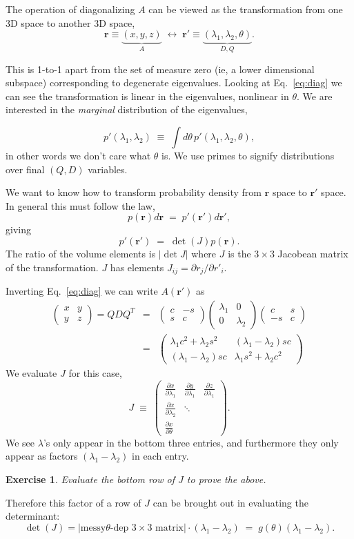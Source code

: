 \documentclass[12pt,letterpaper]{report}
\newcommand\be{\begin{equation}}
\newcommand\ee{\end{equation}}
\newcommand\bea{\begin{eqnarray}}
\newcommand\eea{\end{eqnarray}}
\newtheorem{exe}[thm]{Exercise}
\newcommand{\sym}[3]{\ensuremath{\left(\begin{array}{ll}#1 &#2 \\ #2 &#3%
\end{array}\right)}}
\newcommand{\mat}[4]{\ensuremath{\left(\begin{array}{ll}#1 &#2 \\ #3 &#4%
\end{array}\right)}}
\newcommand{\mbf}[1]{{\mathbf #1}}
\newcommand{\pd}[2]{\frac{\partial #1}{\partial #2}}
\begin{document}
The operation of diagonalizing $A$ can be viewed as the
transformation from one 3D space to another 3D space, \be \mbf{r}
\equiv \underbrace{(x,y,z)}_{A} \; \longleftrightarrow \; \mbf{r}'
\equiv \underbrace{(\lambda_1,\lambda_2, \theta)}_{D,Q}. \ee

This is 1-to-1 apart from the set of measure zero (ie, a lower
dimensional subspace) corresponding to degenerate eigenvalues.
Looking at Eq.~\ref{eq:diag} we can see the transformation is
linear in the eigenvalues, nonlinear in $\theta$. We are
interested in the {\em marginal} distribution of the eigenvalues,

\be
    p'(\lambda_1,\lambda_2) \;\equiv \;
\int d\theta \, p'(\lambda_1,\lambda_2,\theta), \ee in other words
we don't care what $\theta$ is. We use primes to signify
distributions over final $(Q,D)$ variables.

We want to know how to transform probability density from
$\mbf{r}$ space to $\mbf{r}'$ space. In general this must follow
the law, \be
    p(\mbf{r}) d\mbf{r} \; = \; p'(\mbf{r}') d\mbf{r}',
\ee giving \be \label{eq:p}
    p'(\mbf{r}') \; = \; \det(J) p(\mbf{r}).
\ee The ratio of the volume elements is $|\det J|$ where $J$ is
the $3\times 3$ Jacobean matrix of the transformation. $J$ has
elements $J_{ij} = \partial r_j / \partial r'_i$.

Inverting Eq.~\ref{eq:diag} we can write $A(\mbf{r}')$ as \bea
\sym{x}{y}{z} = Q D Q^T &=
&\mat{c}{-s}{s}{c}\sym{\lambda_1}{0}{\lambda_2}
\mat{c}{s}{-s}{c} \nonumber \\
&=& \mat{\lambda_1 c^2 + \lambda_2 s^2}{(\lambda_1-\lambda_2)sc}%
{(\lambda_1-\lambda_2)sc}{\lambda_1 s^2 + \lambda_2 c^2} \eea We
evaluate $J$ for this case, \be
    J \; \equiv \; \left(\begin{array}{lll}
\pd{x}{\lambda_1} & \pd{y}{\lambda_1} & \pd{z}{\lambda_1} \\
\pd{x}{\lambda_2} & \ddots & \\ \pd{x}{\theta} & & \end{array}
\right). \ee We see $\lambda$'s only appear in the bottom three
entries, and furthermore they only appear as factors $(\lambda_1 -
\lambda_2)$ in each entry.
\begin{exe}
Evaluate the bottom row of $J$ to prove the above.
\end{exe}
Therefore this factor of a row of $J$ can be brought out in
evaluating the determinant: \be \det(J) = \biggl| \mbox{messy
$\theta$-dep $3\times 3$ matrix} \biggr| \cdot (\lambda_1 -
\lambda_2) \; = \; g(\theta) (\lambda_1 - \lambda_2). \ee
\end{document}
